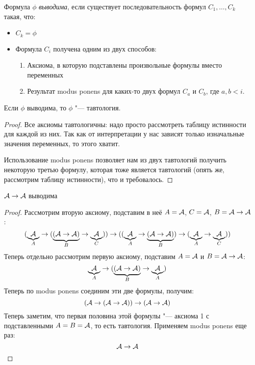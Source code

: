 \begin{Def}
	Формула $\phi$ \textit{выводима}, если существует последовательность формул $C_1, \dots, C_k$ такая, что:
	\begin{itemize}
	\item $C_k = \phi$
	\item Формула $C_i$ получена одним из двух способов:	
		\begin{enumerate}
		\item Аксиома, в которую подставлены произвольные формулы вместо переменных
		\item Результат modus ponens для каких-то двух формул $C_a$ и $C_b$, где $a, b < i$.
		\end{enumerate}
	\end{itemize}
\end{Def}

\begin{theorem}[корректность]
	Если $\phi$ выводима, то $\phi$ "--- тавтология.
\end{theorem}
\begin{proof}
	Все аксиомы тавтологичны: надо просто рассмотреть таблицу истинности для каждой из них.
	Так как от интерпретации у нас зависят только изначальные значения переменных, то этого хватит.

	Использование modus ponens позволяет нам из двух тавтологий получить некоторую третью формулу, которая
	тоже является тавтологий (опять же, рассмотрим таблицу истинности), что и требовалось.
\end{proof}

\begin{lemma}\label{aToA}
	$\mathcal A \to \mathcal A$ выводима
\end{lemma}
\begin{proof}
	Рассмотрим вторую аксиому, подставим в неё $A=\mathcal A$, $C=\mathcal A$, $B=\mathcal A \to \mathcal A$:
	\[ (\underbrace{\mathcal A}_A \to (\underbrace{(\mathcal A \to \mathcal A)}_B \to \underbrace{\mathcal A}_C)) \to ((\underbrace{\mathcal A}_A \to \underbrace{(\mathcal A \to \mathcal A)}_B) \to (\underbrace{\mathcal A}_A \to \underbrace{\mathcal A}_C)) \]
	Теперь отдельно рассмотрим первую аксиому, подставим $A=\mathcal A$ и $B=\mathcal A \to \mathcal A$:
	\[ \underbrace{\mathcal A}_A \to (\underbrace{(\mathcal A \to \mathcal A)}_B \to \underbrace{\mathcal A}_A) \]
	Теперь по modus ponens соединим эти две формулы, получим:
	\[ (\mathcal A \to (\mathcal A \to \mathcal A)) \to (\mathcal A \to \mathcal A) \]
	Теперь заметим, что первая половина этой формулы "--- аксиома 1 с подставленными $A=B=\mathcal A$, то есть тавтология.
	Применяем modus ponens еще раз:
	\[ \mathcal A \to \mathcal A \]
\end{proof}

